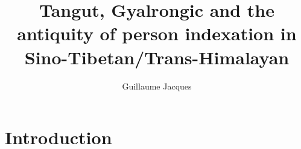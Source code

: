 \documentclass[oldfontcommands,oneside,a4paper,11pt]{article}
\begin{document}
 
\title{Tangut, Gyalrongic and the antiquity of person indexation in Sino-Tibetan/Trans-Himalayan}
\author{Guillaume Jacques}
\maketitle
\linenumbers

\section{Introduction}



\citealt{jacques12internal}

\citet{hill14derivational}

\citealt{zeisler15eat}

\citet{zeisler04}




\citet{delancey89agreement}
\citet{driem93agreement}
\citet{lapolla92}
\end{document}
